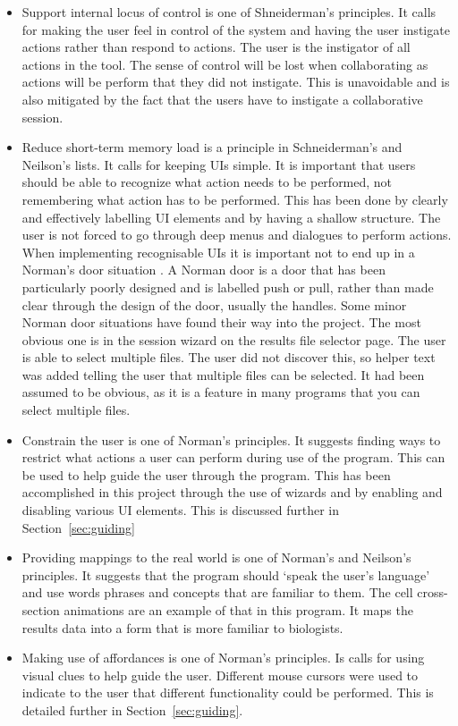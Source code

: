 \begin{itemize}
\item Support internal locus of control is one of Shneiderman's principles.  It calls for making the user feel in control of the system and having the user instigate actions rather than respond to actions.  The user is the instigator of all actions in the tool.  The sense of control will be lost when collaborating as actions will be perform that they did not instigate.  This is unavoidable and is also mitigated by the fact that the users have to instigate a collaborative session.
\item Reduce short-term memory load is a principle in Schneiderman's and Neilson's lists.  It calls for keeping \acp{UI} simple.  It is important that users should be able to recognize what action needs to be performed, not remembering what action has to be performed.  This has been done by clearly and effectively labelling \ac{UI} elements and by having a shallow structure.  The user is not forced to go through deep menus and dialogues to perform actions.  When implementing recognisable \acp{UI} it is important not to end up in a Norman's door situation .  A Norman door is a door that has been particularly poorly designed and is labelled push or pull, rather than made clear through the design of the door, usually the handles.  Some minor Norman door situations have found their way into the project.  The most obvious one is in the session wizard on the results file selector page.  The user is able to select multiple files.  The user did not discover this, so helper text was added telling the user that multiple files can be selected.  It had been assumed to be obvious, as it is a feature in many programs that you can select multiple files.
\item Constrain the user is one of Norman's principles.  It suggests finding ways to restrict what actions a user can perform during use of the program.  This can be used to help guide the user through the program.  This has been accomplished in this project through the use of wizards and by enabling and disabling various \ac{UI} elements.  This is discussed further in Section~\ref{sec:guiding}
\item Providing mappings to the real world is one of Norman's and Neilson's principles.  It suggests that the program should `speak the user's language' and use words phrases and concepts that are familiar to them.  The cell cross-section animations are an example of that in this program.  It maps the results data into a form that is more familiar to biologists.
\item Making use of affordances is one of Norman's principles.  Is calls for using visual clues to help guide the user.  Different mouse cursors were used to indicate to the user that different functionality could be performed.  This is detailed further in Section~\ref{sec:guiding}.

\end{itemize}
